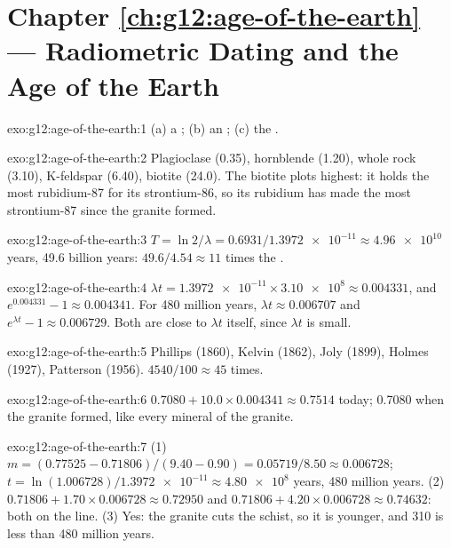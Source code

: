 \section*{Chapter \ref{ch:g12:age-of-the-earth} --- Radiometric Dating and the Age of the Earth}

\begin{solution}{exo:g12:age-of-the-earth:1}
(a) a ; (b) an ; (c) the .
\end{solution}

\begin{solution}{exo:g12:age-of-the-earth:2}
Plagioclase (0.35), hornblende (1.20), whole rock (3.10), K-feldspar (6.40),
biotite (24.0). The biotite plots highest: it holds the most rubidium-87 for
its strontium-86, so its rubidium has made the most strontium-87 since the
granite formed.
\end{solution}

\begin{solution}{exo:g12:age-of-the-earth:3}
$T = \ln 2/\lambda = 0.6931/\num{1.3972e-11} \approx \num{4.96e10}$ years,
49.6 billion years: $49.6/4.54 \approx 11$ times the .
\end{solution}

\begin{solution}{exo:g12:age-of-the-earth:4}
$\lambda t = \num{1.3972e-11} \times \num{3.10e8} \approx 0.004331$, and
$e^{0.004331} - 1 \approx 0.004341$. For 480 million years, $\lambda t
\approx 0.006707$ and $e^{\lambda t} - 1 \approx 0.006729$. Both are close to
$\lambda t$ itself, since $\lambda t$ is small.
\end{solution}

\begin{solution}{exo:g12:age-of-the-earth:5}
Phillips (1860), Kelvin (1862), Joly (1899), Holmes (1927), Patterson
(1956). $4540/100 \approx 45$ times.
\end{solution}

\begin{solution}{exo:g12:age-of-the-earth:6}
$0.7080 + 10.0 \times 0.004341 \approx 0.7514$ today; 0.7080 when the granite
formed, like every mineral of the granite.
\end{solution}

\begin{solution}{exo:g12:age-of-the-earth:7}
(1) $m = (0.77525 - 0.71806)/(9.40 - 0.90) = 0.05719/8.50 \approx 0.006728$;
$t = \ln(1.006728)/\num{1.3972e-11} \approx \num{4.80e8}$ years, 480 million
years. (2) $0.71806 + 1.70 \times 0.006728 \approx 0.72950$ and $0.71806 + 4.20
\times 0.006728 \approx 0.74632$: both on the line. (3) Yes: the granite cuts
the schist, so it is younger, and 310 is less than 480 million years.
\end{solution}

